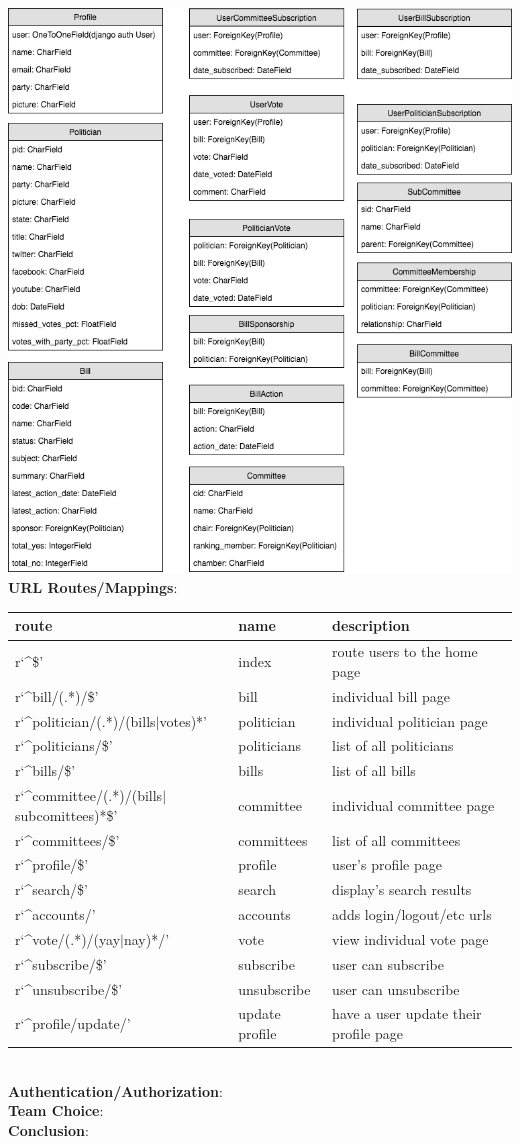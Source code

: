 \documentclass{article}
\newcommand{\n}{\noindent}
\begin{document}
\includegraphics[scale=0.5]{politifind-data-model-UPDATED.png} \\

\n\textbf{URL Routes/Mappings}: 
\begin{center}
\begin{tabular}{ l | l | l }
route & name & description \\
\hline
r`\^{}\$' & index & route users to the home page \\
r`\^{}bill/(.*)/\$' & bill & individual bill page\\
r`\^{}politician/(.*)/(bills$\mid$votes)*' & politician & individual politician page\\
r`\^{}politicians/\$' & politicians & list of all politicians\\
r`\^{}bills/\$' & bills & list of all bills\\
r`\^{}committee/(.*)/(bills$\mid$subcomittees)*\$' & committee & individual committee page\\
r`\^{}committees/\$' & committees & list of all committees\\
r`\^{}profile/\$' & profile & user's profile page\\
r`\^{}search/\$' & search & display's search results\\
r`\^{}accounts/' & accounts & adds login/logout/etc urls\\
r`\^{}vote/(.*)/(yay$\mid$nay)*/' & vote & view individual vote page\\
r`\^{}subscribe/\$' & subscribe & user can subscribe\\
r`\^{}unsubscribe/\$' & unsubscribe & user can unsubscribe\\
r`\^{}profile/update/' & update profile & have a user update their profile page\\
\end{tabular}
\end{center}
\\

\n\textbf{Authentication/Authorization}: \\

\n\textbf{Team Choice}: \\

\n\textbf{Conclusion}: \\
\end{document}
